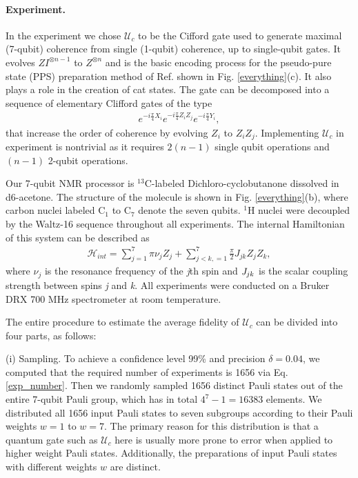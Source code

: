 \documentclass[prl,twocolumn,showpacs]{revtex4-1}
\newcommand{\ket}[1]{|#1\rangle}
\begin{document}
\paragraph*{Experiment.}
In the experiment we chose  $\mathcal{U}_{c}$ to be the Cifford gate used  to generate  maximal (7-qubit) coherence from single (1-qubit) coherence, up to single-qubit gates. It evolves $ZI^{\otimes n-1}$ to $Z^{\otimes n}$ and is the basic encoding process  for the pseudo-pure state (PPS) preparation method of Ref. \cite{Knill2000} shown in Fig. \ref{everything}(c). It  also plays a role  in  the creation of cat states. %
 The gate can be decomposed into a sequence of elementary Clifford gates of the type
\begin{align} \label{decomp}
e^{-i\frac{\pi}{4}X_i}e^{-i\frac{\pi}{4}Z_i Z_j} e^{-i\frac{\pi}{4}Y_i},
\end{align}
that  increase the order of coherence by evolving $Z_i$ to $Z_i Z_j$. Implementing $\mathcal{U}_{c}$  in experiment is nontrivial as it requires $2(n-1)$ single qubit operations and $(n-1)$ 2-qubit operations.

Our 7-qubit NMR processor is $^{13}$C-labeled Dichloro-cyclobutanone dissolved in d6-acetone. The structure of the molecule is shown in Fig. \ref{everything}(b), where carbon nuclei labeled C$_1$ to C$_7$ denote the seven qubits. $^1$H nuclei were decoupled by the Waltz-16 sequence throughout all experiments. The internal Hamiltonian of this system can be described as
\begin{align}\label{Hamiltonian}
\mathcal{H}_{int}=\sum\limits_{j=1}^7 {\pi \nu _j } Z_j  + \sum\limits_{j < k,=1}^7 {\frac{\pi}{2}} J_{jk} Z_j Z_k,
\end{align}
where $\nu_j$ is the resonance frequency of the \emph{j}th spin and $\emph{J}_{jk}$ is the scalar coupling strength between spins \emph{j} and \emph{k}. All experiments were conducted on a Bruker DRX 700 MHz spectrometer at room temperature.%

The entire procedure to estimate the average fidelity of $\mathcal{U}_{c}$ can be divided into four parts, as follows:

(i) Sampling. To achieve a confidence level 99\% and precision $\delta = 0.04$, we computed that the required number of experiments is 1656 via Eq. \eqref{exp_number}. Then we randomly sampled  1656 distinct Pauli states out of the entire 7-qubit Pauli group, which has in total $4^7-1=16383$ elements. We distributed all 1656 input Pauli states to seven subgroups according to their Pauli weights $w=1$ to $w=7$. The primary reason for this distribution is that a quantum gate such as $\mathcal{U}_{c}$ here is usually more prone to error when applied to higher weight Pauli states. Additionally, the preparations of input Pauli states with different weights $w$ are distinct.
\end{document}
